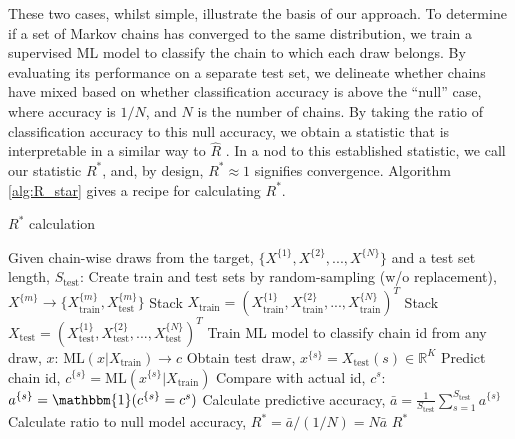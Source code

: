 \documentclass[ba]{imsart}
\numberwithin{equation}{section}
\theoremstyle{plain}
\begin{document}
These two cases, whilst simple, illustrate the basis of our approach. To determine if a set of Markov chains has converged to the same distribution, we train a supervised ML model to classify the chain to which each draw belongs. By evaluating its performance on a separate test set, we delineate whether chains have mixed based on whether classification accuracy is above the ``null'' case, where accuracy is $1/{N}$, and $N$ is the number of chains. By taking the ratio of classification accuracy to this null accuracy, we obtain a statistic that is interpretable in a similar way to $\widehat{R}$ \citep{vehtari2019rank}. In a nod to this established statistic, we call our statistic $R^*$, and, by design, $R^*\approx 1$ signifies convergence. Algorithm \ref{alg:R_star} gives a recipe for calculating $R^*$.

\begin{algorithm}[tb]
	\caption{$R^*$ calculation}
	\label{alg:R_star}
	\begin{algorithmic}
		\STATE Given chain-wise draws from the target, $\{X^{\{1\}},X^{\{2\}},...,X^{\{N\}}\}$ and a test set length, $S_\text{test}$:
		\STATE Create train and test sets by random-sampling (w/o replacement), $X^{\{m\}}\rightarrow\{X^{\{m\}}_\text{train},X^{\{m\}}_\text{test}\}$
		\ENDFOR
		\STATE Stack $X_\text{train} = (X^{\{1\}}_\text{train},X^{\{2\}}_\text{train},...,X^{\{N\}}_\text{train})^T$
		\STATE Stack $X_\text{test} = (X^{\{1\}}_\text{test},X^{\{2\}}_\text{test},...,X^{\{N\}}_\text{test})^T$
		\STATE Train ML model to classify chain id from any draw, $x$: $\text{ML}(x|X_\text{train}) \rightarrow c$
		\STATE Obtain test draw, $x^{\{s\}}=X_\text{test}(s)\in \mathbb{R}^K$
		\STATE Predict chain id, $c^{\{s\}} = \text{ML}(x^{\{s\}}|X_\text{train})$
		\STATE Compare with actual id, $c^s$: $a^{\{s\}}=\mathbbm{1}(c^{\{s\}}=c^s)$
		\ENDFOR
		\STATE Calculate predictive accuracy, $\bar{a} = \frac{1}{S_\text{test}} \sum_{s=1}^{S_\text{test}} a^{\{s\}}$
		\STATE Calculate ratio to null model accuracy, $R^* = \bar{a} / (1 / N) = N \bar{a}$
		\RETURN $R^*$
	\end{algorithmic}
\end{algorithm}
\end{document}
